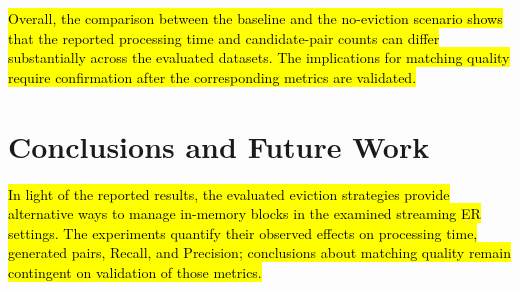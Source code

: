 \documentclass{ieeeaccess}
\begin{document}
\hl{Overall, the comparison between the baseline and the no-eviction scenario shows that the reported processing time and candidate-pair counts can differ substantially across the evaluated datasets. The implications for matching quality require confirmation after the corresponding metrics are validated.}

\begin{table}[!t]
\centering
\caption{Comparison between the baseline and the no-eviction scenario.}
\label{tab:baseline_vs_sem_descarte}

\scriptsize
\setlength{\tabcolsep}{3pt}
\renewcommand{\arraystretch}{0.95}
\end{table}

\section{Conclusions and Future Work} \label{sec:conclusao}

\hl{In light of the reported results, the evaluated eviction strategies provide alternative ways to manage in-memory blocks in the examined streaming ER settings. The experiments quantify their observed effects on processing time, generated pairs, Recall, and Precision; conclusions about matching quality remain contingent on validation of those metrics.}
\end{document}
